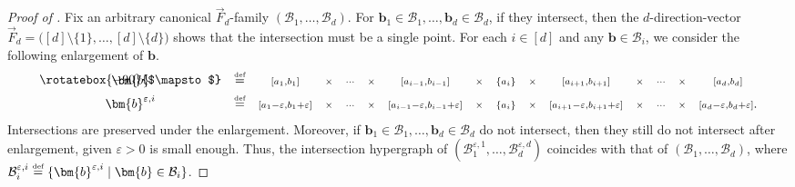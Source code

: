 \documentclass[11pt]{article}
\theoremstyle{definition}
\newcommand*{\eqdef}{\stackrel{\mbox{\normalfont\tiny def}}{=}} %
\newcommand*{\veps}{\varepsilon}                                %
\newcommand*{\vF}{\vec{F}}
\newcommand*{\cB}{\mathcal{B}}
\begin{document}
\begin{proof}[Proof of ]
    Fix an arbitrary canonical $\vF_d$-family $(\cB_1, \dots, \cB_d)$. For $\bm{b}_1 \in \cB_1, \dots, \bm{b}_d \in \cB_d$, if they intersect, then the $d$-direction-vector $\vF_d = \bigl( [d] \setminus \{1\}, \dots, [d] \setminus \{d\} \bigr)$ shows that the intersection must be a single point. For each $i \in [d]$ and any $\bm{b} \in \cB_i$, we consider the following enlargement of $\bm{b}$.
    \[
    \begin{array}{ccccccccccccccc}
        \bm{b} &\eqdef &{\scriptstyle [a_1, b_1]} &{\scriptstyle \times} &{\scriptstyle \cdots} &{\scriptstyle \times} &{\scriptstyle [a_{i-1}, b_{i-1}]} &{\scriptstyle \times} &{\scriptstyle \{a_i\}} &{\scriptstyle \times} &{\scriptstyle [a_{i+1}, b_{i+1}]} &{\scriptstyle \times} &{\scriptstyle \cdots} &{\scriptstyle \times} &{\scriptstyle [a_d, b_d]} \\[-1.25em]
        \rotatebox{-90}{$\mapsto$} & & & & & & & & & & & & & & \\[0.5em]
        \bm{b}^{\veps, i} &\eqdef &{\scriptstyle [a_1-\veps, b_1+\veps]} &{\scriptstyle \times} &{\scriptstyle \cdots} &{\scriptstyle \times} &{\scriptstyle [a_{i-1}-\veps, b_{i-1}+\veps]} &{\scriptstyle \times} &{\scriptstyle \{a_i\}} &{\scriptstyle \times} &{\scriptstyle [a_{i+1}-\veps, b_{i+1}+\veps]} &{\scriptstyle \times} &{\scriptstyle \cdots} &{\scriptstyle \times} &{\scriptstyle [a_d-\veps, b_d+\veps]}. 
    \end{array}
    \]
    Intersections are preserved under the enlargement. Moreover, if $\bm{b}_1 \in \cB_1, \dots, \bm{b}_d \in \cB_d$ do not intersect, then they still do not intersect after enlargement, given $\veps > 0$ is small enough. Thus, the intersection hypergraph of $(\cB_1^{\veps, 1}, \dots, \cB_d^{\veps, d})$ coincides with that of $(\cB_1, \dots, \cB_d)$, where $\cB_i^{\veps, i} \eqdef \{\bm{b}^{\veps, i} \mid \bm{b} \in \cB_i\}$. 


\end{proof}
\end{document}
